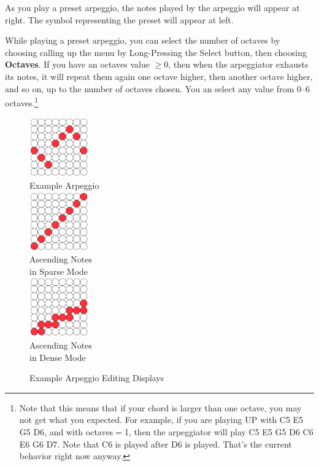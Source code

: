 \documentclass{article}
\begin{document}
As you play a preset arpeggio, the notes played by the arpeggio will appear at right.  The symbol representing the preset will appear at left.

While playing a preset arpeggio, you can select the number of octaves by choosing calling up the menu by Long-Pressing the Select button, then choosing {\bf Octaves}.  If you have an octaves value \(\geq 0\), then when the arpeggiator exhausts its notes, it will repeat them again one octave higher, then another octave higher, and so on, up to the number of octaves chosen. You an select any value from 0--6 octaves.\footnote{Note that this means that if your chord is larger than one octave, you may not get what you expected.  For example, if you are playing UP with C5 E5 G5 D6, and with octaves\(=\)1, then the arpeggiator will play C5 E5 G5 D6 C6 E6 G6 D7.  Note that C6 is played after D6 is played.  That's the current behavior right now anyway.}

\begin{figure}
\vspace{-1em}
\begin{center}
\vspace{-1.5em}\includegraphics[width=1in]{arpeggioexample.pdf}\\
Example Arpeggio\\[2em]
\vspace{-1.5em}\includegraphics[width=1in]{arpeggioup.pdf}\\
Ascending Notes\\in Sparse Mode\\[2em]
\vspace{-1.5em}\includegraphics[width=1in]{arpeggiodoubleup.pdf}\\
Ascending Notes\\in Dense Mode\\
\end{center}
\vspace{-1em}\caption{\small Example Arpeggio Editing Displays}
\label{arpeggioediting}
\end{figure}
\end{document}
